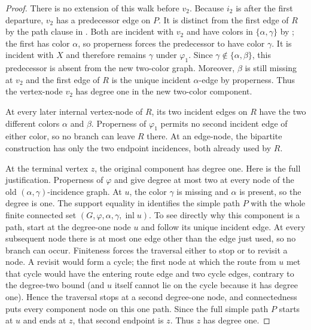 \begin{proof}
There is no extension of this walk before $v_2$.  Because $i_2$ is after
the first departure, $v_2$ has a predecessor edge on $P$.  It is distinct
from the first edge of $R$ by the path clause in
.  Both are incident with $v_2$ and
have colors in $\{\alpha,\gamma\}$ by
; the first has color $\alpha$, so
properness forces the predecessor to have color $\gamma$.  It is incident
with $X$ and therefore remains $\gamma$ under $\varphi_1$.  Since
$\gamma\notin\{\alpha,\beta\}$, this predecessor is absent from the new
two-color graph.  Moreover, $\beta$ is still missing at $v_2$ and the
first edge of $R$ is the unique incident $\alpha$-edge by properness.
Thus the vertex-node $v_2$ has degree one in the new two-color component.

At every later internal vertex-node of $R$, its two incident edges on
$R$ have the two different colors $\alpha$ and $\beta$.  Properness of
$\varphi_1$ permits no second incident edge of either color, so no branch
can leave $R$ there.  At an edge-node, the bipartite construction
 has only the two endpoint incidences,
both already used by $R$.

At the terminal vertex $z$, the original component has degree one.  Here
is the full justification.  Properness of $\varphi$ and
 give degree at most two at every
node of the old $(\alpha,\gamma)$-incidence graph.  At $u$, the color
$\gamma$ is missing and $\alpha$ is present, so the degree is one.  The
support equality in  identifies the
simple path $P$ with the whole finite connected set
$(G,\varphi,\alpha,\gamma,\operatorname{inl}u)$.
To see directly why this component is a path, start at the degree-one node
$u$ and follow its unique incident edge.  At every subsequent node there
is at most one edge other than the edge just used, so no branch can occur.
Finiteness forces the traversal either to stop or to revisit a node.  A
revisit would form a cycle; the first node at which the route from $u$
met that cycle would have the entering route edge and two cycle edges,
contrary to the degree-two bound (and $u$ itself cannot lie on the cycle
because it has degree one).  Hence the traversal stops at a second
degree-one node, and connectedness puts every component node on this one
path.  Since the full simple path $P$ starts at $u$ and ends at $z$, that
second endpoint is $z$.  Thus $z$ has degree one.


\end{proof}
